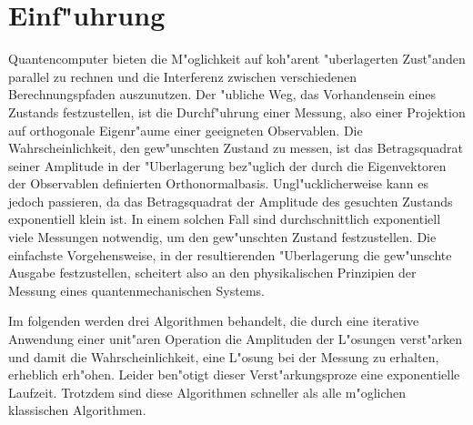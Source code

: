 \newtheorem{theorem}{Theorem}[section] 
\newtheorem{satz}[theorem]{Satz} 
\newtheorem{definition}[theorem]{Definition} 
\newtheorem{lemma}[theorem]{Lemma} 
\newtheorem{beispiel}[theorem]{Beispiel} 
\newtheorem{alg}[theorem]{Algorithmus} 

\newcommand{\ket}[1]{\left| #1 \right>}
\newcommand{\proj}[2]{|#1\left.\right>\left<\right.#2|} 
\newcommand{\scalar}[2]{\left<#1|#2\right>} 
\newcommand{\scalars}[3]{\left<#1|#2|#3\right>} 
\newcommand{\reg}[2]{\ket{\Psi\left( #1,#2\right)}} 
\newcommand{\dft}{\mbox{DFT}} 
\newcommand{\diag}[1]{\mbox{ diag}\left(#1\right)} 
\newcommand{\unten}[1]{\lfloor #1 \rfloor} 
\newcommand{\oben}[1]{\lceil #1 \rceil} 
\newcommand{\betrag}[1]{\vert #1 \vert} 
\newcommand{\k}{\log_{\lambda} m_0} 
\newcommand{\ok}{\lceil \log_{\lambda} m_0 \rceil} 

\newenvironment{beweis}{{\bf Beweis: }}{\hfill *}
 
\noindent 

 \section{Einf"uhrung} 
   Quantencomputer bieten die M"oglichkeit auf koh"arent "uberlagerten Zust"anden parallel zu rechnen und die Interferenz zwischen verschiedenen Berechnungspfaden 
   auszunutzen. Der "ubliche Weg, das Vorhandensein 
   eines Zustands festzustellen, ist die Durchf"uhrung einer Messung, also einer Projektion auf orthogonale Eigenr"aume einer geeigneten Observablen. Die 
   Wahrscheinlichkeit, den gew"unschten Zustand zu messen, ist das Betragsquadrat seiner Amplitude in der "Uberlagerung bez"uglich der durch 
   die Eigenvektoren der Observablen definierten Orthonormalbasis. Ungl"ucklicherweise kann es jedoch passieren, da\3 das Betragsquadrat der Amplitude des gesuchten Zustands
   exponentiell klein ist. In einem solchen Fall sind durchschnittlich exponentiell viele Messungen notwendig, 
   um den gew"unschten Zustand festzustellen. Die einfachste Vorgehensweise, in der resultierenden "Uberlagerung die gew"unschte Ausgabe festzustellen, 
   scheitert also an den physikalischen Prinzipien der Messung eines quantenmechanischen Systems. 
  
   Im folgenden werden drei Algorithmen behandelt, die durch eine iterative Anwendung einer unit"aren Operation die Amplituden der L"osungen verst"arken und 
   damit die Wahrscheinlichkeit, eine L"osung bei der Messung zu erhalten, erheblich erh"ohen. Leider ben"otigt dieser Verst"arkungsproze\3 eine 
   exponentielle Laufzeit. Trotzdem sind diese Algorithmen schneller als alle m"oglichen klassischen Algorithmen.  
